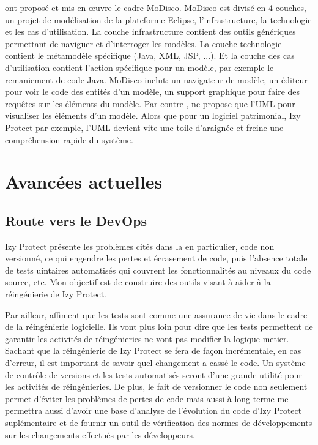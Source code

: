 \documentclass[a4paper]{article}
\begin{document}
\citet{Brun14c} ont proposé et mis en œuvre le cadre MoDisco.
MoDisco est divisé en 4 couches, un projet de modélisation de la plateforme Eclipse, l'infrastructure, la technologie et les cas d'utilisation.
La couche infrastructure contient des outils génériques permettant de naviguer et d'interroger les modèles.
La couche technologie contient le métamodèle spécifique (Java, XML, JSP, ...).
Et la couche des cas d'utilisation contient l'action spécifique pour un modèle, par exemple le remaniement de code Java.
MoDisco inclut: un navigateur de modèle, un éditeur pour voir le code des entités d'un modèle, un support graphique pour faire des requêtes sur les éléments du modèle. 
Par contre \citet{Brun14c}, ne propose que l'UML pour visualiser les éléments d'un modèle.
Alors que pour  un logiciel patrimonial, Izy Protect par exemple, l'UML devient vite une toile d'araignée et freine une compréhension rapide du système.

\section{Avancées actuelles}
\subsection{Route vers le DevOps}
\label{sec: devOps}

Izy Protect présente les problèmes cités dans la  en particulier, code non versionné, ce qui engendre les pertes et écrasement de code, puis l'absence totale de tests uintaires automatisés qui couvrent les fonctionnalités au niveaux du code source, etc.
Mon objectif est de construire des outils visant à aider  à la réingénierie de Izy Protect. 

Par ailleur, \citet{Deme02a} affiment que les tests sont comme une assurance de vie dans le cadre de la réingénierie logicielle. 
Ils vont plus loin pour dire que les tests permettent de garantir les activités de réingénieries ne vont pas modifier la logique metier.  
Sachant que la réingénierie de Izy Protect se fera de façon incrémentale, en cas d'erreur, il est important de savoir quel changement a cassé le code.
Un système de contrôle de versions et les tests automatisés seront d'une grande utilité pour les activités de réingénieries.
De plus, le fait de versionner le code  non seulement permet d'éviter les problèmes de pertes de code mais aussi à long terme me permettra aussi 
d'avoir une base d'analyse de l'évolution du code d'Izy Protect suplémentaire et de fournir  un outil de vérification des normes de développements sur les changements effectués par les développeurs.
\end{document}
